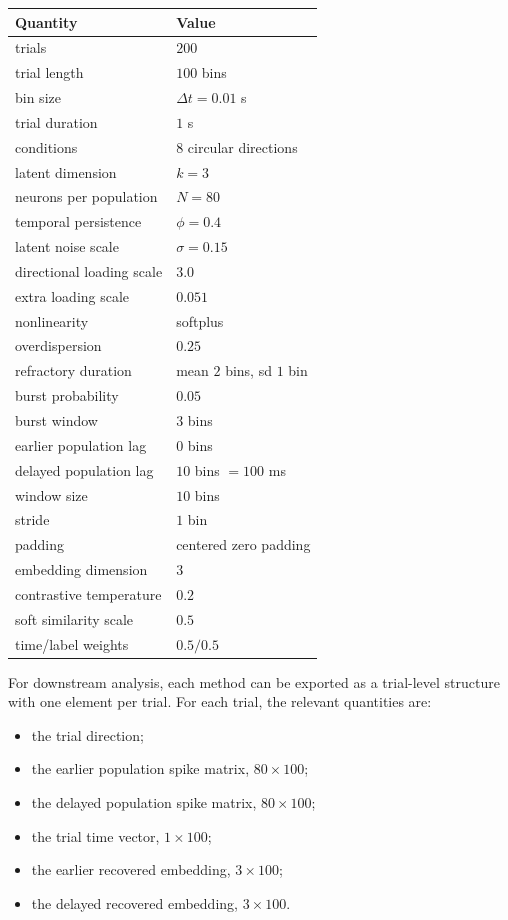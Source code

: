 \documentclass[11pt]{article}
\begin{document}
\begin{center}
\begin{tabular}{ll}
\hline
Quantity & Value\\
\hline
trials & $200$\\
trial length & $100$ bins\\
bin size & $\Delta t = 0.01$ s\\
trial duration & $1$ s\\
conditions & $8$ circular directions\\
latent dimension & $k=3$\\
neurons per population & $N=80$\\
temporal persistence & $\phi=0.4$\\
latent noise scale & $\sigma=0.15$\\
directional loading scale & $3.0$\\
extra loading scale & $0.051$\\
nonlinearity & softplus\\
overdispersion & $0.25$\\
refractory duration & mean $2$ bins, sd $1$ bin\\
burst probability & $0.05$\\
burst window & $3$ bins\\
earlier population lag & $0$ bins\\
delayed population lag & $10$ bins $=100$ ms\\
window size & $10$ bins\\
stride & $1$ bin\\
padding & centered zero padding\\
embedding dimension & $3$\\
contrastive temperature & $0.2$\\
soft similarity scale & $0.5$\\
time/label weights & $0.5/0.5$\\
\hline
\end{tabular}
\end{center}

For downstream analysis, each method can be exported as a trial-level structure
with one element per trial. For each trial, the relevant quantities are:

\begin{itemize}
    \item the trial direction;
    \item the earlier population spike matrix, $80 \times 100$;
    \item the delayed population spike matrix, $80 \times 100$;
    \item the trial time vector, $1 \times 100$;
    \item the earlier recovered embedding, $3 \times 100$;
    \item the delayed recovered embedding, $3 \times 100$.
\end{itemize}
\end{document}

